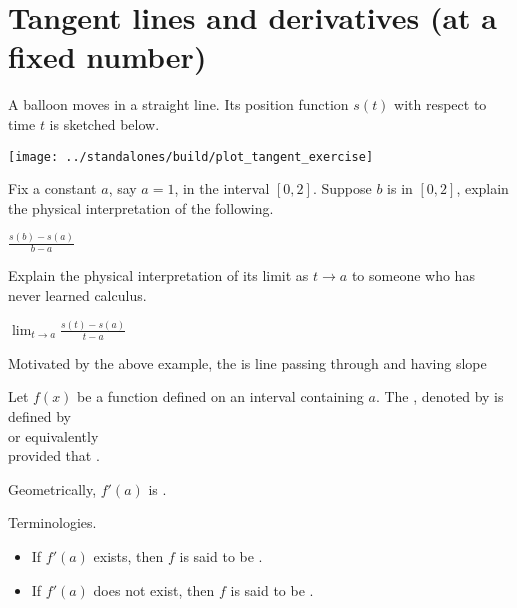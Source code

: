 \documentclass[../main.tex]{subfiles}
\begin{document}
 \section{Tangent lines and derivatives (at a fixed number)}

  A balloon moves in a straight line. Its position function \(s(t)\) with respect to time \(t\) is sketched below. 

  \begin{center}
    \texttt{[image: ../standalones/build/plot\_tangent\_exercise]}
  \end{center}

  Fix a constant \(a\), say \(a = 1\), in the interval \([0,2]\). Suppose \(b\) is in \([0,2]\), explain the physical interpretation of the following. 

  \(\frac{s(b) - s(a)}{b - a}\)

  Explain the physical interpretation of its limit as \(t \to a\) to someone who has never learned calculus. 

  \(\lim_{t \to a} \frac{s(t) - s(a)}{t - a}\)

  Motivated by the above example, the  is \underline{\hspace{2cm}} line passing through \underline{\hspace{2in}} and having slope 

  \begin{mdframed}[style=simple]
    Let \(f(x)\) be a function defined on an \underline{\hspace{1in}} interval containing \(a\). The , denoted by  is defined by
    \begin{equation}\label{eq:def-derivative-1}
    \end{equation}
    or equivalently 
    \begin{equation}\label{eq:def-derivative-2}
    \end{equation}
    provided that \underline{\hspace{2in}}.

  \end{mdframed}

  \faStar{} Geometrically, \(f'(a)\) is \underline{\hspace{5in}}.

  Terminologies. 
  \begin{itemize}
    \item If \(f'(a)\) exists, then \(f\) is said to be .
    \item If \(f'(a)\) does not exist, then \(f\) is said to be .
  \end{itemize}
\end{document}
